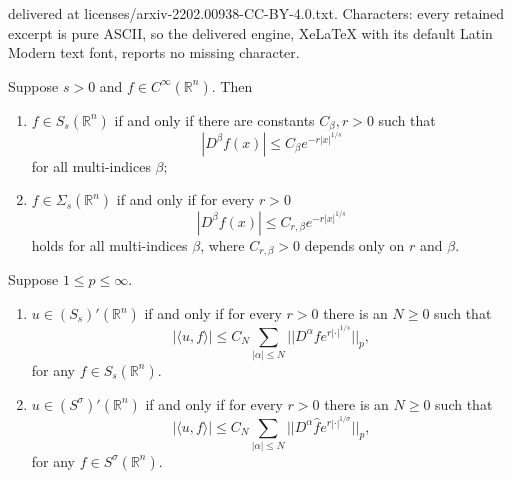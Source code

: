 \documentclass[10pt,a4paper]{amsart}
\begin{document}
delivered at licenses/arxiv-2202.00938-CC-BY-4.0.txt. Characters: every retained excerpt is pure ASCII, so the delivered engine, XeLaTeX with its default Latin Modern text font, reports no missing character.
\begin{prop} \label{prop:Ssalt}
Suppose $s>0$ and $f\in C^\infty(\mathbb{R}^n)$. Then
\begin{enumerate}[label=(\alph*)]
    \item $f\in S_s(\mathbb{R}^n)$ if and only if there are constants $C_\beta,r>0$ such that
    \begin{equation}\label{eq:Ssalt}
    |D^\beta f(x)| \leq C_\beta e^{- r |x|^{1/s}}
    \end{equation}
    for all multi-indices $\beta$;
    \item $f\in\Sigma_s(\mathbb{R}^n)$ if and only if for every $r>0$
\begin{equation}\label{eq:Ssigalt}
    |D^\beta f(x)| \leq C_{r,\beta} e^{- r |x|^{1/s}}
\end{equation}
holds for all multi-indices $\beta$, where $C_{r,\beta}>0$ depends only on $r$ and $\beta$.

\end{enumerate}
\end{prop}

\begin{prop}\label{prop:Ssdual}
 Suppose $1\leq p \leq \infty$.
\begin{enumerate}[label=(\roman*)]
    \item $u\in (S_s)'(\mathbb{R}^n)$ if and only if for every $r>0$ there is an $N\geq 0$ such that
    \begin{equation*}
        |\langle u, f \rangle | \leq C_N \sum_{|\alpha|\leq N} || D^\alpha f e^{r|\cdot|^{1/s}} ||_p,
    \end{equation*}
    for any $f\in S_s(\mathbb{R}^n)$.
     \item $u\in (S^\sigma)'(\mathbb{R}^n)$ if and only if for every $r>0$ there is an $N\geq 0$ such that
    \begin{equation*}
        |\langle u, f \rangle | \leq C_N \sum_{|\alpha|\leq N} || D^\alpha \hat{f} e^{r|\cdot|^{1/\sigma}} ||_p,
    \end{equation*}
    for any $f\in S^\sigma(\mathbb{R}^n)$.
\end{enumerate}
\end{prop}
\end{document}
